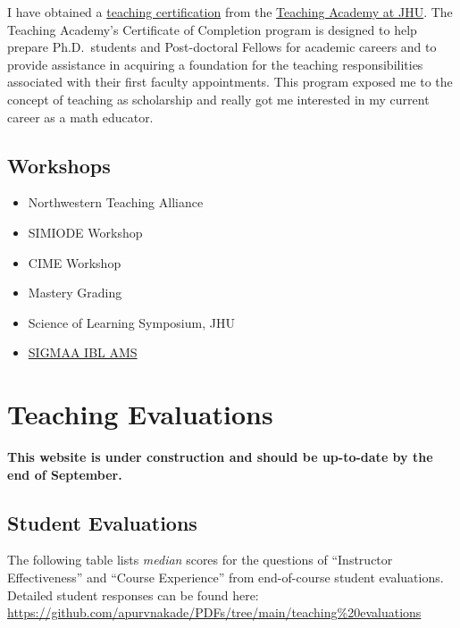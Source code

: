 \documentclass[
]{report}
\providecommand{\tightlist}{%
  \setlength{\itemsep}{0pt}\setlength{\parskip}{0pt}}
\begin{document}
I have obtained a \href{https://ctei.jhu.edu/teaching-academy/coc}{teaching certification} from the
\href{https://ctei.jhu.edu/teaching-academy}{Teaching Academy at JHU}. The Teaching Academy's Certificate
of Completion program is designed to help prepare Ph.D.~students and Post-doctoral Fellows for
academic careers and to provide assistance in acquiring a foundation for the teaching
responsibilities associated with their first faculty appointments. This program exposed me to the
concept of teaching as scholarship and really got me interested in my current career as a math
educator.

\hypertarget{workshops}{%
\section{Workshops}\label{workshops}}

\begin{itemize}
\tightlist
\item
  Northwestern Teaching Alliance
\item
  SIMIODE Workshop
\item
  CIME Workshop
\item
  Mastery Grading
\item
  Science of Learning Symposium, JHU
\item
  \href{https://www.maa.org/member-communities/sigmaas}{SIGMAA IBL AMS}
\end{itemize}

\hypertarget{teaching-evaluations}{%
\chapter{Teaching Evaluations}\label{teaching-evaluations}}

\textbf{This website is under construction and should be up-to-date by the end of September.}

\hypertarget{student-evaluations}{%
\section{Student Evaluations}\label{student-evaluations}}

The following table lists \emph{median} scores for the questions of ``Instructor Effectiveness'' and ``Course Experience'' from end-of-course student evaluations. Detailed student responses can be found here: \url{https://github.com/apurvnakade/PDFs/tree/main/teaching\%20evaluations}
\end{document}
